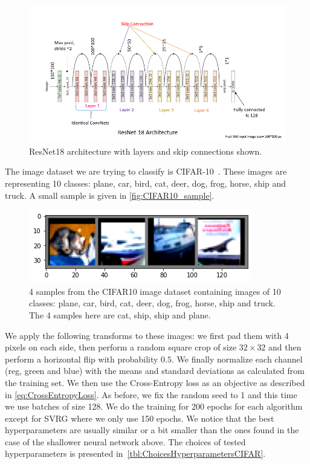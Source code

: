 \documentclass[a4paper,11pt,oneside]{report}
\begin{document}
\begin{figure}
    \centering
    \includegraphics[scale=0.35]{midterm presentation/images/ResNet18.png}
    \caption{ResNet18 architecture with layers and skip connections shown.}
    \label{fig:resnet18}
\end{figure}

The image dataset we are trying to classify is CIFAR-10~\cite{Krizhevsky09learningmultiple}. These images are representing 10 classes: plane, car, bird, cat, deer, dog, frog, horse, ship and truck. A small sample is given in \autoref{fig:CIFAR10_sample}.

\begin{figure}
    \centering
    \includegraphics{figures/CIFAR10_sample.png}
    \caption{4 samples from the CIFAR10 image dataset containing images of 10 classes: plane, car, bird, cat, deer, dog, frog, horse, ship and truck. The 4 samples here are cat, ship, ship and plane.}
    \label{fig:CIFAR10_sample}
\end{figure}

We apply the following transforms to these images: we first pad them with 4 pixels on each side, then perform a random square crop of size $32\times32$ and then perform a horizontal flip with probability $0.5$. We finally normalize each channel (reg, green and blue) with the means and standard deviations as calculated from the training set. We then use the Cross-Entropy loss as an objective as described in \autoref{eq:CrossEntropyLoss}. As before, we fix the random seed to 1 and this time we use batches of size 128. We do the training for 200 epochs for each algorithm except for SVRG where we only use 150 epochs. We notice that the best hyperparameters are usually similar or a bit smaller than the ones found in the case of the shallower neural network above. The choices of tested hyperparameters is presented in~\autoref{tbl:ChoicesHyperparametersCIFAR}.
\end{document}
